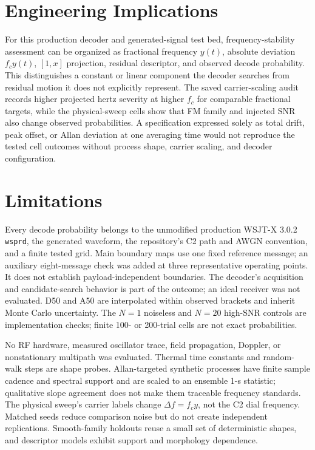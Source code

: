 \documentclass{ieeeaccess}
\begin{document}
\section{Engineering Implications}
For this production decoder and generated-signal test bed, frequency-stability assessment can be organized as fractional frequency $y(t)$, absolute deviation $f_cy(t)$, $[1,x]$ projection, residual descriptor, and observed decode probability. This distinguishes a constant or linear component the decoder searches from residual motion it does not explicitly represent. The saved carrier-scaling audit records higher projected hertz severity at higher $f_c$ for comparable fractional targets, while the physical-sweep cells show that FM family and injected SNR also change observed probabilities. A specification expressed solely as total drift, peak offset, or Allan deviation at one averaging time would not reproduce the tested cell outcomes without process shape, carrier scaling, and decoder configuration.

\section{Limitations}
Every decode probability belongs to the unmodified production WSJT-X 3.0.2 \texttt{wsprd}, the generated waveform, the repository's C2 path and AWGN convention, and a finite tested grid. Main boundary maps use one fixed reference message; an auxiliary eight-message check was added at three representative operating points. It does not establish payload-independent boundaries. The decoder's acquisition and candidate-search behavior is part of the outcome; an ideal receiver was not evaluated. D50 and A50 are interpolated within observed brackets and inherit Monte Carlo uncertainty. The $N=1$ noiseless and $N=20$ high-SNR controls are implementation checks; finite 100- or 200-trial cells are not exact probabilities.

No RF hardware, measured oscillator trace, field propagation, Doppler, or nonstationary multipath was evaluated. Thermal time constants and random-walk steps are shape probes. Allan-targeted synthetic processes have finite sample cadence and spectral support and are scaled to an ensemble 1-s statistic; qualitative slope agreement does not make them traceable frequency standards. The physical sweep's carrier labels change $\Delta f=f_cy$, not the C2 dial frequency. Matched seeds reduce comparison noise but do not create independent replications. Smooth-family holdouts reuse a small set of deterministic shapes, and descriptor models exhibit support and morphology dependence.
\end{document}
